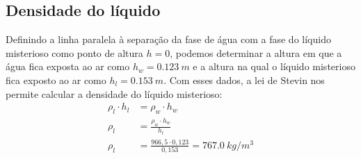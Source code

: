 \subsection{Densidade do líquido}
Definindo a linha paralela à separação da fase de água com a fase do líquido misterioso como ponto de altura \(h = 0\), podemos determinar a altura em que a água fica exposta ao ar como \(h_w = \qty{0,123}{m}\) e a altura na qual o líquido misterioso fica exposto ao ar como \(h_l = \qty{0,153}{m}\). Com esses dados, a lei de Stevin nos permite calcular a densidade do líquido misterioso:
\begin{align*}
    \rho_l \cdot h_l &= \rho_w \cdot h_w\\
    \rho_l &= \frac{\rho_w \cdot h_w}{h_l}\\
    \rho_l &= \frac{966,5 \cdot 0,123}{0,153} = \qty{767,0}{kg/m^3} 
\end{align*}

